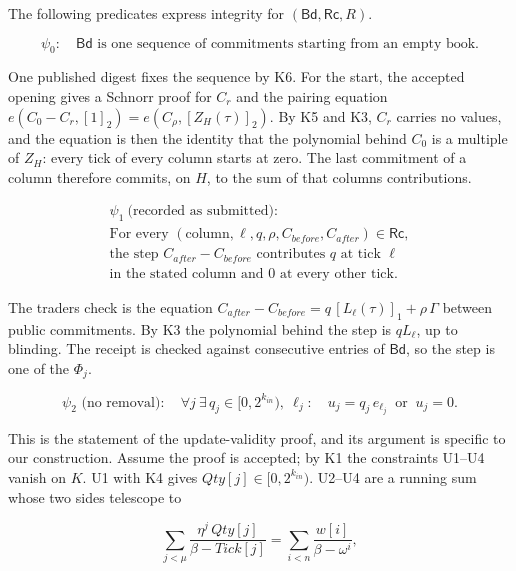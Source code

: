The following predicates express integrity for \((\mathsf{Bd},\mathsf{Rc},R)\).

\[\psi_0:\quad \mathsf{Bd} \text{ is one sequence of commitments starting from an empty book.}\]

One published digest fixes the sequence by K6. For the start, the accepted opening gives a Schnorr proof for \(C_r\) and the pairing equation \(e(C_0 - C_r, [1]_2) = e(C_\rho, [Z_H(\tau)]_2)\). By K5 and K3, \(C_r\) carries no values, and the equation is then the identity that the polynomial behind \(C_0\) is a multiple of \(Z_H\): every tick of every column starts at zero. The last commitment of a column therefore commits, on \(H\), to the sum of that column\textquotesingle s contributions.

\[
\begin{gathered}
\psi_1\ \text{(recorded as submitted)}: \\
\text{For every } (\text{column}, \ell, q, \rho, C_{before}, C_{after})
  \in \mathsf{Rc}, \\
\text{the step } C_{after} - C_{before} \text{ contributes } q
  \text{ at tick } \ell \\
\text{in the stated column and } 0 \text{ at every other tick.}
\end{gathered}
\]

The trader\textquotesingle s check is the equation \(C_{after} - C_{before} = q\,[L_\ell(\tau)]_1 + \rho\,\Gamma\) between public commitments. By K3 the polynomial behind the step is \(q L_\ell\), up to blinding. The receipt is checked against consecutive entries of \(\mathsf{Bd}\), so the step is one of the \(\Phi_j\).

\[\psi_2 \text{ (no removal)}:\quad \forall j\ \exists\, q_j \in [0, 2^{k_{in}}),\ \ell_j:\quad u_j = q_j\, e_{\ell_j} \ \text{ or } \ u_j = 0.\]

This is the statement of the update-validity proof, and its argument is specific to our construction. Assume the proof is accepted; by K1 the constraints U1--U4 vanish on \(K\). U1 with K4 gives \(Qty[j] \in [0, 2^{k_{in}})\). U2--U4 are a running sum whose two sides telescope to

\[\sum_{j<\mu} \frac{\eta^j\, Qty[j]}{\beta - Tick[j]} = \sum_{i<n} \frac{w[i]}{\beta - \omega^i},\]

